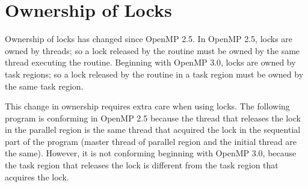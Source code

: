 \pagebreak
\chapter{Ownership of Locks}
\label{chap:lock_owner}

Ownership of locks has changed since OpenMP 2.5. In OpenMP 2.5, locks are owned 
by threads; so a lock released by the  routine must be 
owned by the same thread executing the routine.  Beginning with OpenMP 3.0, locks are owned 
by task regions; so a lock released by the  routine in 
a task region must be owned by the same task region.

This change in ownership requires extra care when using locks. The following program 
is conforming in OpenMP 2.5 because the thread that releases the lock  
in the parallel region is the same thread that acquired the lock in the sequential 
part of the program (master thread of parallel region and the initial thread are 
the same). However, it is not conforming beginning with OpenMP 3.0, because the task 
region that releases the lock  is different from the task region that 
acquires the lock.




